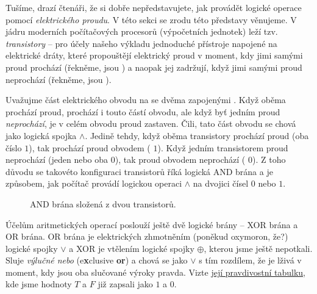 Tušíme, drazí čtenáři, že si dobře nepředstavujete, jak provádět logické operace
pomocí \emph{elektrického proudu}. V této sekci se zrodu této představy
věnujeme. V jádru moderních počítačových procesorů (výpočetních jednotek) leží
tzv. \emph{transistory} -- pro účely našeho výkladu jednoduché přístroje
napojené na elektrické dráty, které propouštějí elektrický proud v moment, kdy
jimi samými proud prochází (řekněme, jsou ) a naopak jej zadržují,
když jimi samými proud neprochází (řekněme, jsou ).

Uvažujme část elektrického obvodu na  se dvěma
zapojenými . Když oběma  prochází proud,
prochází i touto částí obvodu, ale když byť jedním  proud
\emph{neprochází}, je v celém obvodu proud zastaven. Čili, tato část obvodu se
chová jako logická spojka $ \wedge $. Jedině tehdy, když oběma transistory
prochází proud (oba  číslo $1$), tak prochází proud obvodem
( $1$). Když jedním transistorem proud neprochází (jeden nebo oba
 $0$), tak proud obvodem neprochází ( $0$). Z toho
důvodu se takovéto konfiguraci transistorů říká logická AND brána a je způsobem,
jak počítač provádí logickou operaci $ \wedge $ na dvojici čísel $0$ nebo $1$.

\begin{figure}[ht]
  \centering

  \caption{AND brána složená z dvou transistorů.}
  \label{fig:and-brana}
\end{figure}

Účelům aritmetických operací poslouží ještě dvě logické brány -- XOR brána a OR
brána. OR brána je elektrických zhmotněním (poněkud oxymoron, že?) logické
spojky $ \vee $ a XOR je vtělením logické spojky $ \oplus $, kterou jsme ještě
nepotkali. Sluje \emph{výlučné nebo} (e\textbf{x}clusive \textbf{or}) a chová se
jako $ \vee $ s tím rozdílem, že je lživá v moment, kdy jsou oba slučované
výroky pravda. Vizte \hyperref[table:xor-tabulka]{její pravdivostní tabulku},
kde jsme hodnoty $T$ a $F$ již zapsali jako $1$ a $0$.


